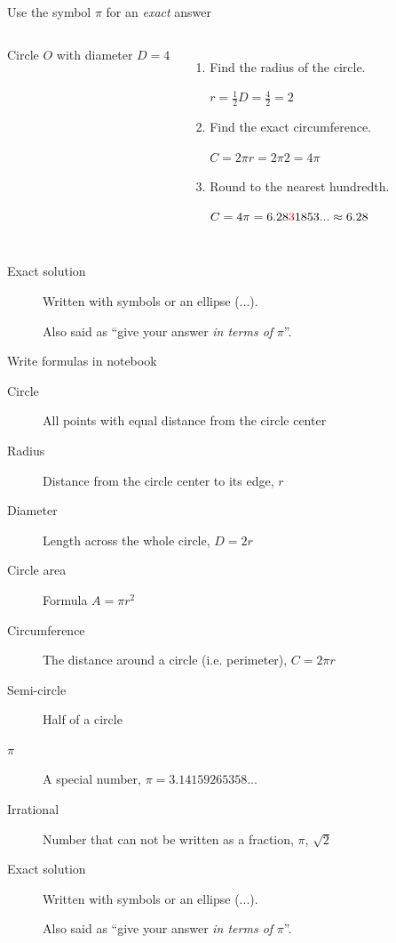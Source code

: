 \begin{frame}{Use the symbol $\pi$ for an \emph{exact} answer}
    \begin{columns}
        Circle $O$ with diameter $D=4$
        \begin{enumerate}
            \item Find the radius of the circle. \par \medskip
              {$r = \frac{1}{2}D = \frac{4}{2} =2 $} \medskip
            \item Find the exact circumference. \par \medskip
              {$C = 2 \pi r = 2 \pi 2 = 4 \pi $} \medskip
            \item Round to the nearest hundredth. \par \medskip
              $C = 4 \pi = 6.28{\color{red}3}1853... \approx 6.28 $
        \end{enumerate}
    \end{columns} \vspace{2cm}
    \begin{description}
        \item[Exact solution] Written with symbols or an ellipse ($...$). \par 
        Also said as ``give your answer \emph{in terms of} $\pi$''.
    \end{description}
    \end{frame}
    
\begin{frame}{Write formulas in notebook}
    \begin{description}
        \item[Circle] All points with equal distance from the circle center
        \item[Radius] Distance from the circle center to its edge, $r$
        \item[Diameter] Length across the whole circle, $D=2r$        
        \item[Circle area] Formula $A=\pi r^2$
        \item[Circumference] The distance around a circle (i.e. perimeter), $C=2\pi r$
        \item[Semi-circle] Half of a circle
        \item[{\Large $\pi$}] A special number, $\pi = 3.14159265358...$
        \item[Irrational] Number that can not be written as a fraction, $\pi$, $\sqrt{2}$
        \item[Exact solution] Written with symbols or an ellipse ($...$). \par 
        Also said as ``give your answer \emph{in terms of} $\pi$''.
        \end{description}
    \end{frame}

